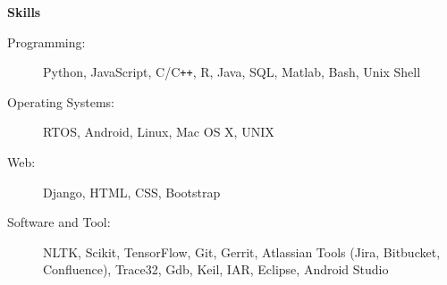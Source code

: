 \documentclass[letterpaper,11pt]{article}
\newcommand{\resheading}[1]{{\large \colorbox{mygrey}{\begin{minipage}{\textwidth}{\textbf{#1 \vphantom{p\^{E}}}}\end{minipage}}}}
\begin{document}
\resheading{Skills}

\begin{description}
    \item[Programming:] Python, JavaScript, C/C{}\verb!++!, R, Java, SQL, Matlab, Bash, Unix Shell
    \item[Operating Systems:] RTOS, Android, Linux, Mac OS X, {\sc UNIX}
    \item[Web:] Django, HTML, CSS, Bootstrap
    \item[Software and Tool:] NLTK, Scikit, TensorFlow, Git, Gerrit, Atlassian Tools (Jira, Bitbucket, Confluence), Trace32, Gdb, Keil, IAR, Eclipse, Android Studio
\end{description}
\end{document}
